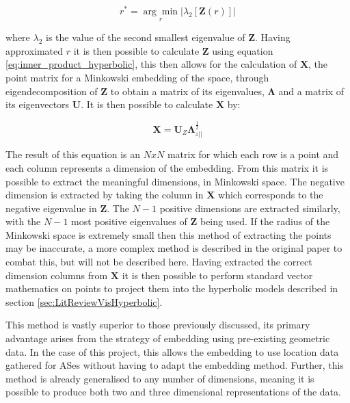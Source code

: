 \begin{equation}
\label{eq:argmin_hyperbolic}
r^*=\underset{r}{\arg\min}|\lambda_2[\boldsymbol{Z}(r)]|
\end{equation}

where $\lambda_2$ is the value of the second smallest eigenvalue of $\boldsymbol{Z}$. Having approximated $r$ it is then possible to calculate $\boldsymbol{Z}$ using equation \ref{eq:inner_product_hyperbolic}, this then allows for the calculation of $\boldsymbol{X}$, the point matrix for a Minkowski embedding of the space, through eigendecomposition of $\boldsymbol{Z}$ to obtain a matrix of its eigenvalues, $\boldsymbol{\Lambda}$ and a matrix of its eigenvectors $\boldsymbol{U}$. It is then possible to calculate $\boldsymbol{X}$ by:

\begin{equation}
\label{eq:embedding_x}
\boldsymbol{X}=\boldsymbol{U}_Z\boldsymbol{\Lambda}_{z||}^{\frac{1}{2}}
\end{equation}

The result of this equation is an $NxN$ matrix for which each row is a point and each column represents a dimension of the embedding. From this matrix it is possible to extract the meaningful dimensions, in Minkowski space. The negative dimension is extracted by taking the column in $\boldsymbol{X}$ which corresponds to the negative eigenvalue in $\boldsymbol{Z}$. The $N-1$ positive dimensions are extracted similarly, with the $N-1$ most positive eigenvalues of $\boldsymbol{Z}$ being used. If the radius of the Minkowski space is extremely small then this method of extracting the points may be inaccurate, a more complex method is described in the original paper to combat this, but will not be described here. Having extracted the correct dimension columns from $\boldsymbol{X}$ it is then possible to perform standard vector mathematics on points to project them into the hyperbolic models described in section \ref{sec:LitReviewVisHyperbolic}.
 
This method is vastly superior to those previously discussed, its primary advantage arises from the strategy of embedding using pre-existing geometric data. In the case of this project, this allows the embedding to use location data gathered for ASes without having to adapt the embedding method. Further, this method is already generalised to any number of dimensions, meaning it is possible to produce both two and three dimensional representations of the data. 

